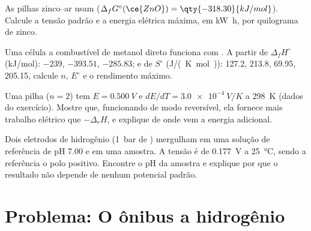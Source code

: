 \begin{exercise}[$\star\star$]\label{exo:b2:cell-thermodynamics:9}
As pilhas zinco--ar usam  ($\Delta_f G^\circ(\ce{ZnO}) =
\qty{-318.30}{kJ/mol}$). Calcule a tensão padrão e a energia elétrica máxima,
em \unit{kW.h}, por quilograma de zinco.
\end{exercise}

\begin{exercise}[$\star\star\star$]\label{exo:b2:cell-thermodynamics:10}
Uma célula a combustível de metanol direto funciona com . A partir de
$\Delta_f H^\circ$ (\unit{kJ/mol}):  $-239$,  $-393.51$,
 $-285.83$; e de $S^\circ$ (\unit{J/(K.mol)}):  127.2,
 213.8,  69.95,  205.15, calcule $n$, $E^\circ$ e o
rendimento máximo.
\end{exercise}

\begin{exercise}[$\star\star\star$]\label{exo:b2:cell-thermodynamics:11}
Uma pilha ($n = 2$) tem $E = \qty{0.500}{V}$ e $dE/dT = \qty{+3.0e-4}{V/K}$ a
\qty{298}{K} (dados do exercício). Mostre que, funcionando de modo reversível,
ela fornece mais trabalho elétrico que $-\Delta_r H$, e explique de onde vem a
energia adicional.
\end{exercise}

\begin{exercise}[$\star\star\star$]\label{exo:b2:cell-thermodynamics:12}
Dois eletrodos de hidrogênio (\qty{1}{bar} de ) mergulham em uma solução
de referência de pH 7.00 e em uma amostra. A tensão é de \qty{0.177}{V} a
\qty{25}{\degreeCelsius}, sendo a referência o polo positivo. Encontre o pH da
amostra e explique por que o resultado não depende de nenhum potencial padrão.
\end{exercise}

\section{Problema: O ônibus a hidrogênio}

